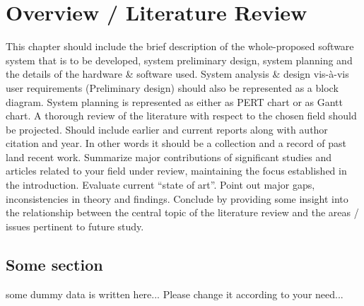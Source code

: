 \chapter{Overview / Literature Review }
This chapter should include the brief description of the whole-proposed software system that is to be developed, system preliminary design, system planning and the details of the hardware \& software used. System analysis \& design vis-à-vis user requirements (Preliminary design) should also be represented as a block diagram.  System planning is represented as either as PERT chart or as Gantt chart.
A thorough review of the literature with respect to the chosen field should be projected. Should include earlier and current reports along with author citation and year. In other words it should be a collection and a record of past land recent work. Summarize major contributions of significant studies and articles related to your field under review, maintaining the focus established in the introduction. Evaluate current “state of art”. Point out major gaps, inconsistencies in theory and findings. Conclude by providing some insight into the relationship between the central topic of the literature review and the areas / issues pertinent to future study.

\section{Some section}
some dummy data is written here... Please change it according to your need...
